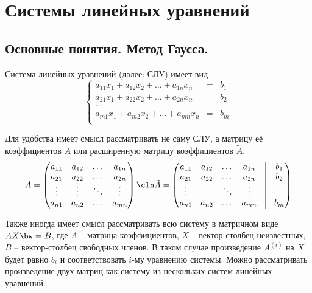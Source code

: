 \section{Системы линейных уравнений}
\label{slu}
%

\subsection{Основные понятия. Метод Гаусса.}

\begin{df}
  Система линейных уравнений (далее: СЛУ) имеет вид
  $$
    \left\{
      \begin{array}{cll}
      a_{11}x_1 + a_{12}x_2+\ldots+a_{1n}x_n & = & b_1\\
      a_{21}x_1 + a_{22}x_2+\ldots+a_{2n}x_n & = & b_2\\
      \ldots&&\\
      a_{m1}x_1 + a_{m2}x_2+\ldots+a_{mn}x_n & = & b_m\\
      \end{array}
    \right.
  $$
\end{df}

  Для удобства имеет смысл рассматривать не саму СЛУ, а матрицу её коэффициентов $A$ или расширенную матрицу коэффициентов $\tilde A$.
  $$
  A =
    \begin{pmatrix}
     a_{11}&a_{12}&\dots&a_{1n}\\
     a_{21}&a_{22}&\dots&a_{2n}\\
     \vdots&\vdots&\ddots&\vdots\\
     a_{n1}&a_{n2}&\dots&a_{mn}
    \end{pmatrix}
  \cln
  \tilde A =
    \begin{pmatrix}
     a_{11}&a_{12}&\dots&a_{1n}&\vline&b_1\\
     a_{21}&a_{22}&\dots&a_{2n}&\vline&b_2\\
     \vdots&\vdots&\ddots&\vdots&\vline&\\
     a_{n1}&a_{n2}&\dots&a_{mn}&\vline& b_m
    \end{pmatrix}
  $$

  Также иногда имеет смысл рассматривать всю систему в матричном виде $AX\bw=B$, где $A$ -- матрица коэффициентов, $X$ -- вектор-столбец неизвестных, $B$ -- вектор-столбец свободных членов. В таком случае произведение $A^{(i)}$ на $X$ будет равно $b_i$ и соответствовать $i$-му уравнению системы. Можно рассматривать произведение двух матриц как систему из нескольких систем линейных уравнений.

